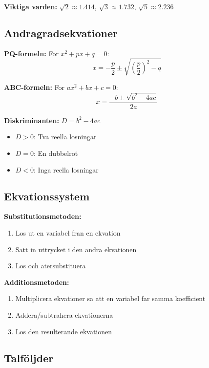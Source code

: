 \documentclass[11pt,a4paper]{article}
\newenvironment{formelbox}{\begin{framed}\color{mainblue}}{\end{framed}}
\begin{document}
\textbf{Viktiga varden:} $\sqrt{2} \approx 1.414$, $\sqrt{3} \approx 1.732$, $\sqrt{5} \approx 2.236$

\subsection{Andragradsekvationer}

\begin{formelbox}
\textbf{PQ-formeln:} For $x^2 + px + q = 0$:
\[ x = -\frac{p}{2} \pm \sqrt{\left(\frac{p}{2}\right)^2 - q} \]
\end{formelbox}

\begin{formelbox}
\textbf{ABC-formeln:} For $ax^2 + bx + c = 0$:
\[ x = \frac{-b \pm \sqrt{b^2 - 4ac}}{2a} \]
\end{formelbox}

\textbf{Diskriminanten:} $D = b^2 - 4ac$
\begin{itemize}
\item $D > 0$: Tva reella losningar
\item $D = 0$: En dubbelrot
\item $D < 0$: Inga reella losningar
\end{itemize}

\subsection{Ekvationssystem}

\textbf{Substitutionsmetoden:}
\begin{enumerate}
\item Los ut en variabel fran en ekvation
\item Satt in uttrycket i den andra ekvationen
\item Los och atersubstituera
\end{enumerate}

\textbf{Additionsmetoden:}
\begin{enumerate}
\item Multiplicera ekvationer sa att en variabel far samma koefficient
\item Addera/subtrahera ekvationerna
\item Los den resulterande ekvationen
\end{enumerate}

\subsection{Talföljder}
\end{document}
